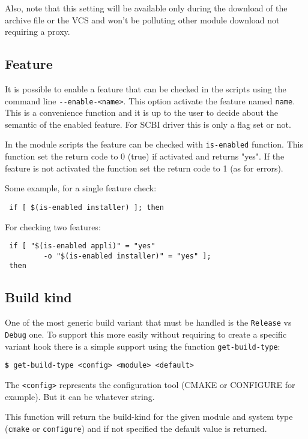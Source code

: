 \documentclass[a4paper,12pt,twoside]{article}
\newcommand{\code}[1]{\texttt{#1}}
\newcommand{\cmd}[1]{\tabto{1cm}\hspace{0.5cm}\texttt{\textbf{\$} #1}}
\newcommand{\ddash}{-{}-}
\begin{document}
Also, note that this setting will be available only during the download of the archive file or the VCS and won't be polluting other module download not requiring a proxy.

\subsection{Feature}
\label{enable-feature}

It is possible to enable a feature that can be checked in the scripts using the command line \code{\ddash{}enable-<name>}. This option activate the feature named \code{name}. This is a convenience function and it is up to the user to decide about the semantic of the enabled feature. For SCBI driver this is only a flag set or not.

In the module scripts the feature can be checked with \code{is-enabled} function. This function set the return code to 0 (true) if activated and returns "yes". If the feature is not activated the function set the return code to 1 (as for errors).

Some example, for a single feature check:

\begin{lstlisting}
 if [ $(is-enabled installer) ]; then
\end{lstlisting}

For checking two features:

\begin{lstlisting}
 if [ "$(is-enabled appli)" = "yes"
         -o "$(is-enabled installer)" = "yes" ];
 then
\end{lstlisting}

\subsection{Build kind}

One of the most generic build variant that must be handled is the \code{Release} vs \code{Debug} one. To support this more easily without requiring to create a specific variant hook there is a simple support using the function \code{get-build-type}:

\cmd{get-build-type <config> <module> <default>}

The \code{<config>} represents the configuration tool (CMAKE or CONFIGURE for example). But it can be whatever string.

This function will return the build-kind for the given module and system type (\code{cmake} or \code{configure}) and if not specified the default value is returned.
\end{document}

